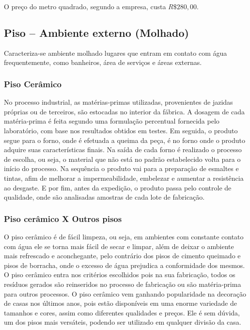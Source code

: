 	O preço do metro quadrado, segundo a empresa, custa $R\$ 280,00$.


\subsection{Piso – Ambiente externo (Molhado)}

        Caracteriza-se ambiente molhado lugares que entram em contato com água frequentemente, como banheiros, área de serviços e áreas externas.

\subsubsection*{\textbf{Piso Cerâmico}}

	No processo industrial, as matérias-primas utilizadas, provenientes de jazidas próprias ou de terceiros, são estocadas no interior da fábrica. A dosagem de cada matéria-prima é feita segundo uma formulação percentual fornecida pelo laboratório, com base nos resultados obtidos em testes. Em seguida, o produto segue para o forno, onde é efetuada a queima da peça, é no forno onde o produto adquire suas características finais. Na saída de cada forno é realizado o processo de escolha, ou seja, o material que não está no padrão estabelecido volta para o início do processo. Na sequência o produto vai para a preparação de esmaltes e tintas, afim de melhorar a impermeabilidade, embelezar e aumentar a resistência ao desgaste. E por fim, antes da expedição, o produto passa pelo controle de qualidade, onde são analisadas amostras de cada lote de fabricação.\cite{pisoCeramico}

\subsubsection*{\textbf{Piso cerâmico X Outros pisos}}

O piso cerâmico é de fácil limpeza, ou seja, em ambientes com constante contato com água ele se torna mais fácil de secar e limpar, além de deixar o ambiente mais refrescado e aconchegante, pelo contrário dos pisos de cimento queimado e pisos de borracha, onde o excesso de água prejudica a conformidade dos mesmos. O piso cerâmico entra nos critérios escolhidos pois na sua fabricação, todos os resíduos gerados são reinseridos no processo de fabricação ou são matéria-prima para outros processos. O piso cerâmico vem  ganhando popularidade na decoração de casas nos últimos anos, pois estão disponíveis em uma enorme variedade de tamanhos e cores, assim como diferentes qualidades e preços. Ele é sem dúvida, um dos pisos mais versáteis, podendo ser utilizado em qualquer divisão da casa.



